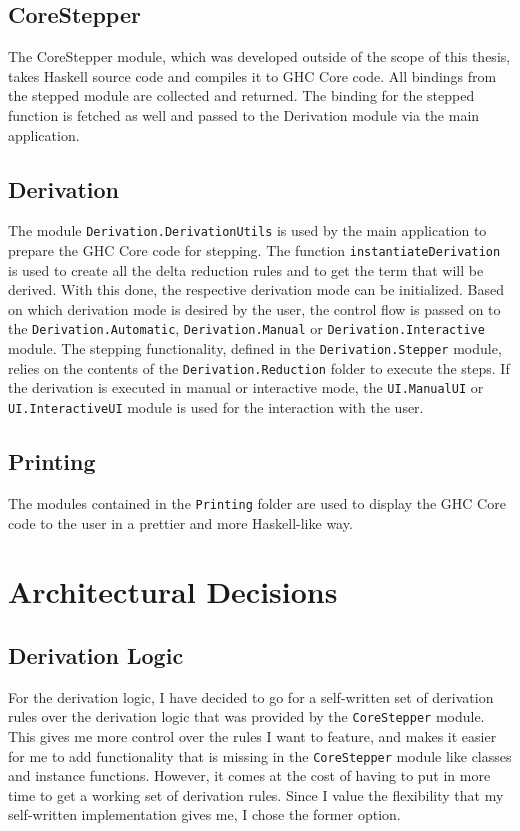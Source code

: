 \subsection{CoreStepper}
The CoreStepper module, which was developed outside of the scope of this thesis,
takes Haskell source code and compiles it to GHC Core code.
All bindings from the stepped module are collected and returned.
The binding for the stepped function is fetched as well and passed to the Derivation module via the main application.

\subsection{Derivation}
The module \texttt{Derivation.DerivationUtils} is used by the main application to prepare the GHC Core code for stepping.
The function \texttt{instantiateDerivation} is used to create all the delta reduction rules and to get the term that will be derived.
With this done, the respective derivation mode can be initialized.
Based on which derivation mode is desired by the user,
the control flow is passed on to the \texttt{Derivation.Automatic}, \texttt{Derivation.Manual} or \texttt{Derivation.Interactive} module.
The stepping functionality,
defined in the \texttt{Derivation.Stepper} module,
relies on the contents of the \texttt{Derivation.Reduction} folder to execute the steps.
If the derivation is executed in manual or interactive mode,
the \texttt{UI.ManualUI} or \texttt{UI.InteractiveUI} module is used for the interaction with the user.

\subsection{Printing}
The modules contained in the \texttt{Printing} folder are used to display the GHC Core code to the user in a prettier and more Haskell-like way.

\section{Architectural Decisions}

\subsection{Derivation Logic}
For the derivation logic,
I have decided to go for a self-written set of derivation rules over the derivation logic that was provided by the \texttt{CoreStepper} module.
This gives me more control over the rules I want to feature,
and makes it easier for me to add functionality that is missing in the \texttt{CoreStepper} module like classes and instance functions.
However, it comes at the cost of having to put in more time to get a working set of derivation rules.
Since I value the flexibility that my self-written implementation gives me,
I chose the former option.

